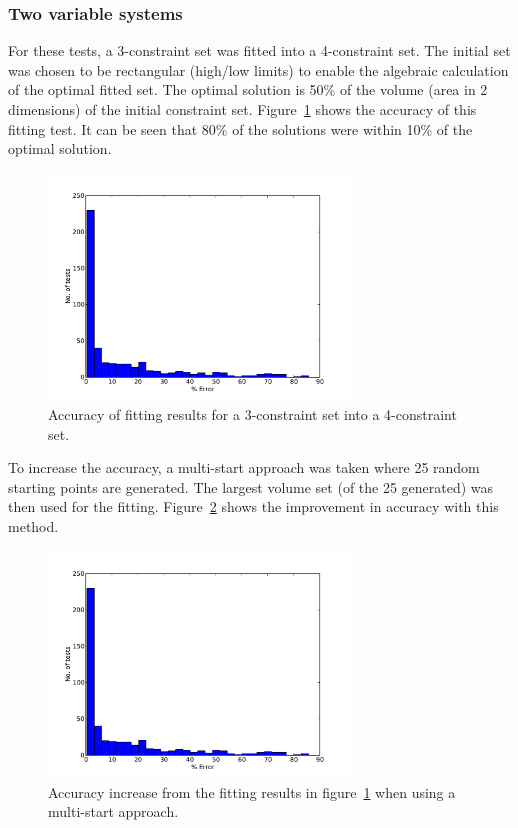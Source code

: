 \subsubsection{Two variable systems}\label{sec:2dfitting}
For these tests, a 3-constraint set was fitted into a 4-constraint set.
The initial set was chosen to be rectangular (high/low limits) to enable the algebraic calculation of the optimal fitted set.
The optimal solution is 50\% of the volume (area in 2 dimensions) of the initial constraint set.
Figure~\ref{fig:arbfitaccuracy2d} shows the accuracy of this fitting test.
It can be seen that 80\% of the solutions were within 10\% of the optimal solution.
\begin{figure}[htbp]
  \centering
    \includegraphics[width=8cm]{graph/arbfitaccuracy2d.pdf}
  \caption[Accuracy of constraint set fitting for 2 variables]{Accuracy of fitting results for a 3-constraint set into a 4-constraint set.}
  \label{fig:arbfitaccuracy2d}
\end{figure}

To increase the accuracy, a multi-start approach was taken where 25 random starting points are generated.
The largest volume set (of the 25 generated) was then used for the fitting.
Figure~\ref{fig:arbfitaccuracy2dmulti} shows the improvement in accuracy with this method.

\begin{figure}[htbp]
  \centering
    \includegraphics[width=8cm]{graph/arbfitaccuracy2d.pdf}
  \caption[Accuracy of constraint set fitting for 2 variables (multi-start)]{Accuracy increase from the fitting results in figure~\ref{fig:arbfitaccuracy2d} when using a multi-start approach.}
  \label{fig:arbfitaccuracy2dmulti}
\end{figure}

